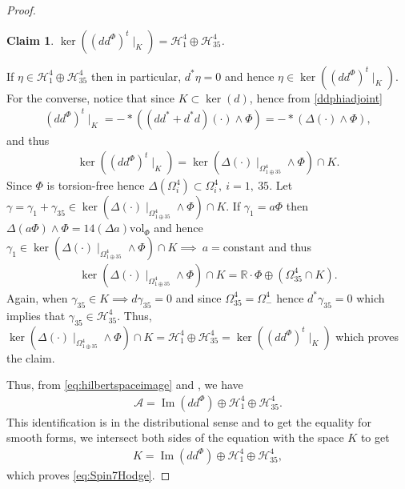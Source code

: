 \documentclass[10pt,a4paper,reqno]{article}
\newtheorem{claim}[theorem]{Claim}
\theoremstyle{definition}
\numberwithin{equation}{section}
\def\bR{\mathbb R}
\newcommand{\vol}{\mathrm{vol}}
\def\ddphi{dd^{\Phi}}
\def\cA{\mathcal{A}}
\def\cH{\mathcal{H}}
\DeclareMathOperator{\Ima}{Im}
\begin{document}
\begin{proof}
\noindent
\begin{claim}\label{claim:Spin7Hodge}
$\ker \left((\ddphi)^t\mid_{K} \right) = \cH^4_1\oplus\cH^4_{35}$.
\end{claim}
If $\eta\in \cH^4_1\oplus\cH^4_{35}$ then in particular, $d^*\eta =0$ and hence $\eta\in \ker \left((\ddphi)^t\mid_{K} \right)$. For the converse, notice that since $K\subset \ker(d)$, hence from \cref{ddphiadjoint}
\begin{align*}
(\ddphi)^t\mid_K = -*((dd^*+d^*d)(\cdot)\wedge \Phi)=-*(\Delta(\cdot) \wedge \Phi),
\end{align*}
and thus
\begin{align*}
\ker \left((\ddphi)^t\mid_{K} \right)=\ker(\Delta(\cdot)\mid_{\Omega^4_{1\oplus 35}}\wedge \Phi)\cap K.
\end{align*}
Since $\Phi$ is torsion-free hence $\Delta(\Omega^4_{i})\subset \Omega^4_i,\ i=1,\ 35$. Let $\gamma=\gamma_1+\gamma_{35}\in \ker(\Delta(\cdot)\mid_{\Omega^4_{1\oplus 35}}\wedge \Phi)\cap K$. If $\gamma_1=a\Phi$ then $\Delta(a\Phi)\wedge \Phi=14(\Delta a)\vol_{\Phi}$ and hence $\gamma_1\in \ker(\Delta(\cdot)\mid_{\Omega^4_{1\oplus 35}}\wedge \Phi)\cap K \implies\ a=\text{constant}$ and thus
\begin{align*}
\ker(\Delta(\cdot)\mid_{\Omega^4_{1\oplus 35}}\wedge \Phi)\cap K = \bR\cdot \Phi \oplus \left(\Omega^4_{35}\cap K \right).
\end{align*}
Again, when $\gamma_{35}\in K \implies d\gamma_{35}=0$ and since $\Omega^4_{35}=\Omega^4_{-}$ hence $d^*\gamma_{35}=0$ which implies that $\gamma_{35}\in \cH^4_{35}$. Thus, $\ker(\Delta(\cdot)\mid_{\Omega^4_{1\oplus 35}}\wedge \Phi)\cap K=\cH^4_1\oplus \cH^4_{35}=\ker((\ddphi)^t\mid_K)$ which proves the claim.

\medskip

Thus, from \cref{eq:hilbertspaceimage} and , we have
\begin{align*}
\cA = \Ima(\ddphi) \oplus \cH^4_1\oplus \cH^4_{35}.
\end{align*}
This identification is in the distributional sense and to get the equality for smooth forms, we intersect both sides of the equation with the space $K$ to get
\begin{align*}
K=\Ima(\ddphi) \oplus \cH^4_1\oplus \cH^4_{35},
\end{align*}
which proves \cref{eq:Spin7Hodge}.
\end{proof}
\end{document}
